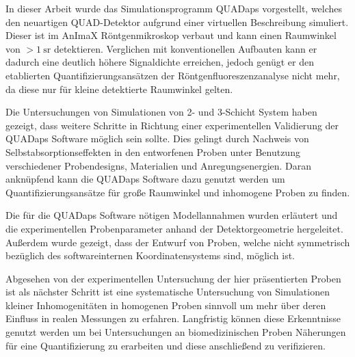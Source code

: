 In dieser Arbeit wurde das Simulationsprogramm QUADaps vorgestellt, welches den neuartigen QUAD-Detektor aufgrund einer virtuellen Beschreibung simuliert. Dieser ist im AnImaX Röntgenmikroskop verbaut und kann einen Raumwinkel von $>\SI{1}{\steradian}$ detektieren. Verglichen mit konventionellen Aufbauten kann er dadurch eine deutlich höhere Signaldichte erreichen, jedoch genügt er den etablierten Quantifizierungsansätzen der Röntgenfluoreszenzanalyse nicht mehr, da diese nur für kleine detektierte Raumwinkel gelten. \newline

Die Untersuchungen von Simulationen von 2- und 3-Schicht System haben gezeigt, dass weitere Schritte in Richtung einer experimentellen Validierung der QUADaps Software möglich sein sollte. Dies gelingt durch Nachweis von Selbstabsorptionseffekten in den entworfenen Proben unter Benutzung verschiedener Probendesigns, Materialien und Anregungsenergien. Daran anknüpfend kann die QUADaps Software dazu genutzt werden um Quantifizierungsansätze für große Raumwinkel und inhomogene Proben zu finden. \newline

Die für die QUADaps Software nötigen Modellannahmen wurden erläutert und die experimentellen Probenparameter anhand der Detektorgeometrie hergeleitet. Außerdem wurde gezeigt, dass der Entwurf von Proben, welche nicht symmetrisch bezüglich des softwareinternen Koordinatensystems sind, möglich ist. \newline

Abgesehen von der experimentellen Untersuchung der hier präsentierten Proben ist als nächster Schritt ist eine systematische Untersuchung von Simulationen kleiner Inhomogenitäten in homogenen Proben sinnvoll um mehr über deren Einfluss in realen Messungen zu erfahren. Langfristig können diese Erkenntnisse genutzt werden um bei Untersuchungen an biomedizinischen Proben Näherungen für eine Quantifizierung zu erarbeiten und diese anschließend zu verifizieren.